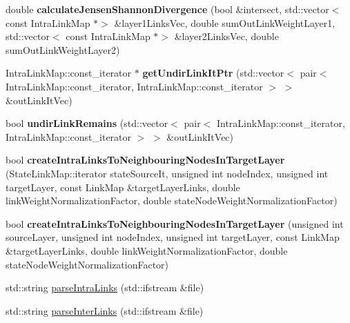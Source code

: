 \begin{DoxyCompactItemize}
\item 
\mbox{\label{classMultiplexNetwork_a09e1b743910bfe6fe052a4cc5161ad38}} 
double {\bfseries calculate\+Jensen\+Shannon\+Divergence} (bool \&intersect, std\+::vector$<$ const Intra\+Link\+Map $\ast$$>$ \&layer1\+Links\+Vec, double sum\+Out\+Link\+Weight\+Layer1, std\+::vector$<$ const Intra\+Link\+Map $\ast$$>$ \&layer2\+Links\+Vec, double sum\+Out\+Link\+Weight\+Layer2)
\item 
\mbox{\label{classMultiplexNetwork_a39e2fe7f6703ac40aba7a47bfbdee60c}} 
Intra\+Link\+Map\+::const\+\_\+iterator $\ast$ {\bfseries get\+Undir\+Link\+It\+Ptr} (std\+::vector$<$ pair$<$ Intra\+Link\+Map\+::const\+\_\+iterator, Intra\+Link\+Map\+::const\+\_\+iterator $>$ $>$ \&out\+Link\+It\+Vec)
\item 
\mbox{\label{classMultiplexNetwork_af9722acb242cc842ffb3848344644554}} 
bool {\bfseries undir\+Link\+Remains} (std\+::vector$<$ pair$<$ Intra\+Link\+Map\+::const\+\_\+iterator, Intra\+Link\+Map\+::const\+\_\+iterator $>$ $>$ \&out\+Link\+It\+Vec)
\item 
\mbox{\label{classMultiplexNetwork_a120781791ec092f4fa79eb0cbfe403b7}} 
bool {\bfseries create\+Intra\+Links\+To\+Neighbouring\+Nodes\+In\+Target\+Layer} (State\+Link\+Map\+::iterator state\+Source\+It, unsigned int node\+Index, unsigned int target\+Layer, const Link\+Map \&target\+Layer\+Links, double link\+Weight\+Normalization\+Factor, double state\+Node\+Weight\+Normalization\+Factor)
\item 
\mbox{\label{classMultiplexNetwork_a28567a8d79b37726ca0af4e169292e76}} 
bool {\bfseries create\+Intra\+Links\+To\+Neighbouring\+Nodes\+In\+Target\+Layer} (unsigned int source\+Layer, unsigned int node\+Index, unsigned int target\+Layer, const Link\+Map \&target\+Layer\+Links, double link\+Weight\+Normalization\+Factor, double state\+Node\+Weight\+Normalization\+Factor)
\item 
std\+::string \mbox{\hyperlink{classMultiplexNetwork_a52326c2cf646b3e15c2266270434629f}{parse\+Intra\+Links}} (std\+::ifstream \&file)
\item 
std\+::string \mbox{\hyperlink{classMultiplexNetwork_abf35346b12fdce91821440d0d49e39fc}{parse\+Inter\+Links}} (std\+::ifstream \&file)

\end{DoxyCompactItemize}
